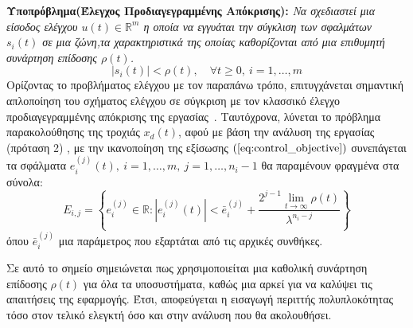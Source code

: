 \textbf{Υποπρόβλημα(Έλεγχος Προδιαγεγραμμένης Απόκρισης):} 
\emph{Να σχεδιαστεί μια είσοδος ελέγχου $u(t) \in \mathbb{R}^m$ η οποία να εγγυάται την σύγκλιση των σφαλμάτων $s_i(t)$ σε μια ζώνη,τα χαρακτηριστικά της οποίας καθορίζονται από μια επιθυμητή συνάρτηση επίδοσης $\rho(t)$.
\begin{equation}
	|s_i(t)| < \rho(t), \quad \forall t \geq 0, \: i=1,\dots,m
	\label{eq:control_objective}
\end{equation}
}
Ορίζοντας το προβλήματος ελέγχου με τον παραπάνω τρόπο, επιτυγχάνεται σημαντική απλοποίηση του σχήματος ελέγχου σε σύγκριση με τον κλασσικό έλεγχο προδιαγεγραμμένης απόκρισης της εργασίας~\cite{bechlioulis2008robust}. Ταυτόχρονα, λύνεται το πρόβλημα παρακολούθησης της τροχιάς $x_d(t)$, αφού με βάση την ανάλυση της εργασίας~\cite{bechlioulis2013output} (πρόταση 2) , με την ικανοποίηση της εξίσωσης $(\ref{eq:control_objective})$ συνεπάγεται τα σφάλματα  $e_i^{(j)}(t),\: i = 1,\dots,m, \: j = 1,\dots,n_i-1$ θα παραμένουν φραγμένα στα σύνολα:
\begin{equation}
	E_{i,j} = \left\{ e_i^{(j)} \in \mathbb{R} : 
			| e_i^{(j)}(t)| < \bar{e}_i^{(j)} + 
			\frac{ 2^{j-1} \lim\limits_{t \rightarrow \infty}\rho(t)}{\lambda^{n_i - j}} \right\}
\end{equation}
όπου $\bar{e}_i^{(j)}$ μια παράμετρος που εξαρτάται από τις αρχικές συνθήκες.

Σε αυτό το σημείο σημειώνεται πως χρησιμοποιείται μια καθολική συνάρτηση επίδοσης $\rho(t)$ για όλα τα υποσυστήματα, καθώς μια αρκεί για να καλύψει τις απαιτήσεις της εφαρμογής. Έτσι, αποφεύγεται η εισαγωγή περιττής πολυπλοκότητας τόσο στον τελικό ελεγκτή όσο και στην ανάλυση που θα ακολουθήσει.

